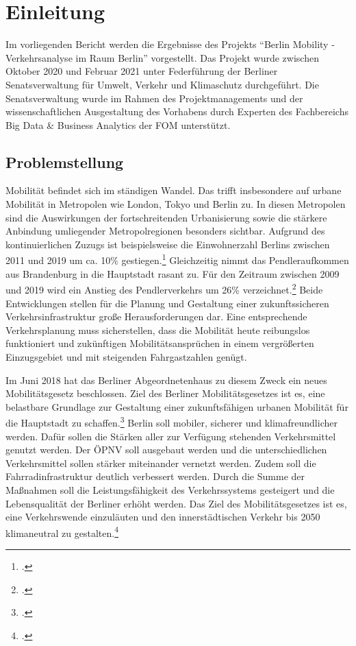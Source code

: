 \section{Einleitung}
Im vorliegenden Bericht werden die Ergebnisse des Projekts \enquote{Berlin Mobility - Verkehrsanalyse im Raum Berlin} vorgestellt. Das Projekt wurde zwischen Oktober 2020 und Februar 2021 unter Federführung der Berliner Senatsverwaltung für Umwelt, Verkehr und Klimaschutz durchgeführt. Die Senatsverwaltung wurde im Rahmen des Projektmanagements und der wissenschaftlichen Ausgestaltung des Vorhabens durch Experten des Fachbereichs Big Data \& Business Analytics der \ac{FOM} unterstützt.

\subsection{Problemstellung}\label{problems}
Mobilität befindet sich im ständigen Wandel. Das trifft insbesondere auf urbane Mobilität in Metropolen wie London, Tokyo und Berlin zu. In diesen Metropolen sind die Auswirkungen der fortschreitenden Urbanisierung sowie die stärkere Anbindung umliegender Metropolregionen besonders sichtbar. Aufgrund des kontinuierlichen Zuzugs ist beispielsweise die Einwohnerzahl Berlins zwischen 2011 und 2019 um ca. 10\% gestiegen.\footcite{Statista.2020} Gleichzeitig nimmt das Pendleraufkommen aus Brandenburg in die Hauptstadt rasant zu. Für den Zeitraum zwischen 2009 und 2019 wird ein Anstieg des Pendlerverkehrs um 26\% verzeichnet.\footcite{VBB-Pendlerblatt.2020}
Beide Entwicklungen stellen für die Planung und Gestaltung einer zukunftssicheren Verkehrsinfrastruktur große Herausforderungen dar. Eine entsprechende Verkehrsplanung muss sicherstellen, dass die Mobilität heute reibungslos funktioniert und zukünftigen Mobilitätsansprüchen in einem vergrößerten Einzugsgebiet und mit steigenden Fahrgastzahlen genügt.

Im Juni 2018 hat das Berliner Abgeordnetenhaus zu diesem Zweck ein neues Mobilitätsgesetz beschlossen. Ziel des Berliner Mobilitätsgesetzes ist es, eine belastbare Grundlage zur Gestaltung einer zukunftsfähigen urbanen Mobilität für die Hauptstadt zu schaffen.\footcite{Mobilitaetsgesetz.2020} Berlin soll mobiler, sicherer und klimafreundlicher werden. Dafür sollen die Stärken aller zur Verfügung stehenden Verkehrsmittel genutzt werden. Der \ac{ÖPNV} soll ausgebaut werden und die unterschiedlichen Verkehrsmittel sollen stärker miteinander vernetzt werden. Zudem soll die Fahrradinfrastruktur deutlich verbessert werden. Durch die Summe der Maßnahmen soll die Leistungsfähigkeit des Verkehrssystems gesteigert und die Lebensqualität der Berliner erhöht werden. Das Ziel des Mobilitätsgesetzes ist es, eine Verkehrswende einzuläuten und den innerstädtischen Verkehr bis 2050 klimaneutral zu gestalten.\footcite{Mobilitaetsgesetz.2020}

